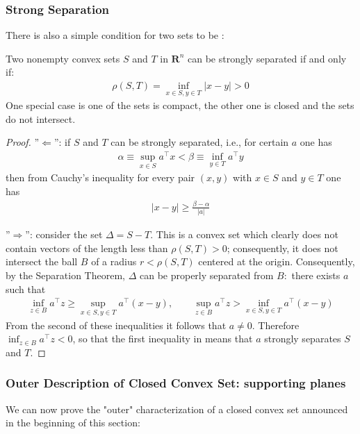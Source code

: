 \documentclass{article}
\begin{document}
\subsubsection{Strong Separation}
There is also a simple  condition for two sets to be :
\begin{lema}
Two nonempty convex sets $S$ and $T$ in $\mathbf{R}^{n}$ can be strongly separated if and only if:
\begin{align*}
\rho(S, T)=\inf _{x \in S, y \in T}|x-y|>0
\end{align*}
One special case is one of the sets is compact, the other one is closed and the sets do not intersect.
\end{lema} 
\begin{proof}\color{ForestGreen}
''$\Leftarrow$'': if $S$ and $T$ can be strongly separated, i.e., for certain $a$ one has
\begin{align*}
\alpha \equiv \sup _{x \in S} a^{\top} x<\beta \equiv \inf _{y \in T} a^{\top} y
\end{align*}
then from Cauchy's inequality for every pair $(x, y)$ with $x \in S$ and $y \in T$ one has
\begin{align*}
|x-y| \geq \frac{\beta-\alpha}{|a|}
\end{align*}

''$\Rightarrow$'':  consider the set $\Delta=S-T$. This is a convex set which clearly does not contain vectors of the length less than $\rho(S, T)>0$; consequently, it does not intersect the ball $B$ of a radius $r<\rho(S, T)$ centered at the origin. Consequently, by the Separation Theorem, $\Delta$ can be properly separated from $B:$ there exists $a$ such that
\begin{align*}
\inf _{z \in B} a^{\top} z \geq \sup _{x \in S, y \in T} a^{\top}(x-y), \qquad \sup _{z \in B} a^{\top} z>\inf _{x \in S, y \in T} a^{\top}(x-y)
\end{align*}
From the second of these inequalities it follows that $a \neq 0$. Therefore $\inf _{z \in B} a^{\top} z<0$, so that the first inequality in  means that $a$ strongly separates $S$ and $T$.
\end{proof}

\subsubsection{Outer Description of Closed Convex Set: supporting planes}\label{sec:out_conx}
We can now prove the "outer" characterization of a closed convex set announced in the beginning of this section:
\end{document}
